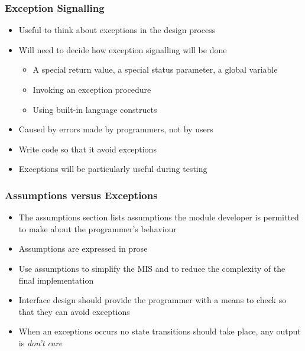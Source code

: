 \documentclass[t,12pt,numbers,fleqn]{beamer}
\begin{document}
\begin{frame}

\frametitle{Exception Signalling}

\begin{itemize}
\item Useful to think about exceptions in the design process
\item Will need to decide how exception signalling will be done
\begin{itemize}
\item A special return value, a special status parameter, a global variable
\item Invoking an exception procedure
\item Using built-in language constructs
\end{itemize}
\item Caused by errors made by programmers, not by users
\item Write code so that it avoid exceptions
\item Exceptions will be particularly useful during testing
\end{itemize}

\end{frame}


\begin{frame}

\frametitle{Assumptions versus Exceptions}

\begin{itemize}
\item The assumptions section lists assumptions the module developer is permitted to make about the programmer's behaviour
\item Assumptions are expressed in prose
\item Use assumptions to simplify the MIS and to reduce the complexity of the final implementation
\item Interface design should provide the programmer with a means to check so that they can avoid exceptions
\item When an exceptions occurs no state transitions should take place, any output is {\it don't care}
\end{itemize}

\end{frame}

\end{document}
